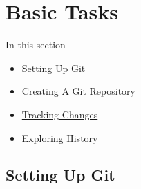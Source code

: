 \section{Basic Tasks}\hypertarget{sec2}{}

\begin{frame}[fragile]
\emptyframetitle
  In this section
  \begin{itemize}
    \item \hyperlink{sec2.1}{Setting Up Git}
    \item \hyperlink{sec2.2}{Creating A Git Repository}
    \item \hyperlink{sec2.3}{Tracking Changes}
    \item \hyperlink{sec2.4}{Exploring History}
  \end{itemize}
\end{frame}

\subsection{Setting Up Git}\hypertarget{sec2.1}{}


